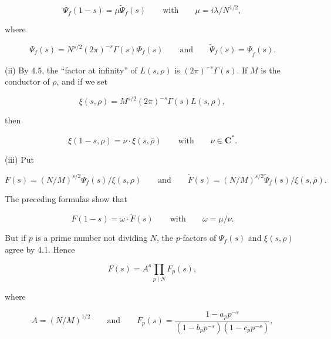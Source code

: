 \documentclass[10pt,oneside]{article}
\begin{document}
\begin{equation*}
\Psi_f(1-s)=\mu\widetilde\Psi_f(s)
\qquad\text{with}\qquad
\mu=i\lambda/N^{1/2},
\end{equation*}

where\par

\begin{equation*}
\Psi_f(s)=N^{s/2}(2\pi)^{-s}\Gamma(s)\Phi_f(s)
\qquad\text{and}\qquad
\widetilde\Psi_f(s)=\Psi_{\widetilde f}(s).
\end{equation*}

(ii) By 4.5, the “factor at infinity” of \(L(s,\rho)\) is \((2\pi)^{-s}\Gamma(s)\). If \(M\) is the conductor of \(\rho\), and if we set\par

\begin{equation*}
\xi(s,\rho)=M^{s/2}(2\pi)^{-s}\Gamma(s)L(s,\rho),
\end{equation*}

then\par

\begin{equation*}
\xi(1-s,\rho)=\nu\cdot\xi(s,\overline\rho)
\qquad\text{with}\qquad
\nu\in\mathbf{C}^*.
\end{equation*}

(iii) Put\par

\begin{equation*}
F(s)=(N/M)^{s/2}\Psi_f(s)/\xi(s,\rho)
\qquad\text{and}\qquad
\widetilde F(s)=(N/M)^{s/2}\widetilde\Psi_f(s)/\xi(s,\overline\rho).
\end{equation*}

The preceding formulas show that\par

\begin{equation*}
F(1-s)=\omega\cdot\widetilde F(s)
\qquad\text{with}\qquad
\omega=\mu/\nu.
\end{equation*}

But if \(p\) is a prime number not dividing \(N\), the \(p\)-factors of \(\Psi_f(s)\) and \(\xi(s,\rho)\) agree by 4.1. Hence\par

\begin{equation*}
F(s)=A^s\prod_{p\mid N}F_p(s),
\end{equation*}

where\par

\begin{equation*}
A=(N/M)^{1/2}
\qquad\text{and}\qquad
F_p(s)=\frac{1-a_pp^{-s}}{(1-b_pp^{-s})(1-c_pp^{-s})},
\end{equation*}
\end{document}
